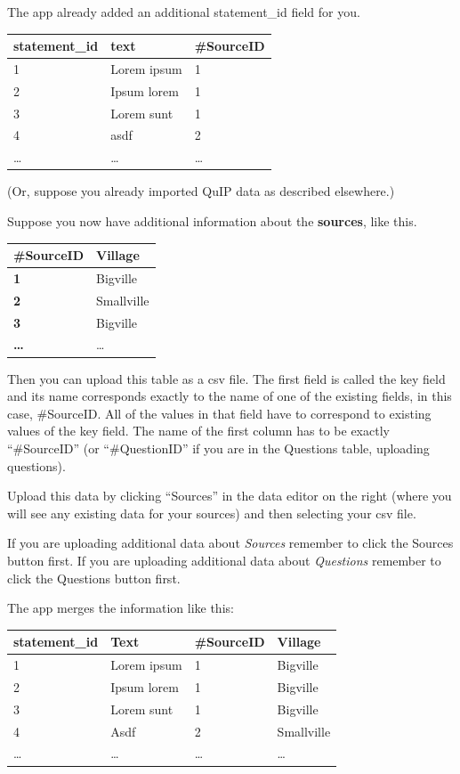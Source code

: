 \documentclass[
]{book}
\begin{document}
The app already added an additional statement\_id field for you.

\begin{longtable}[]{@{}lll@{}}
\toprule
\textbf{statement\_id} & \textbf{text} & \textbf{\#SourceID} \\
\midrule
\endhead
1 & Lorem ipsum & 1 \\
2 & Ipsum lorem & 1 \\
3 & Lorem sunt & 1 \\
4 & asdf & 2 \\
\ldots{} & \ldots{} & \ldots{} \\
\bottomrule
\end{longtable}

(Or, suppose you already imported QuIP data as described elsewhere.)

Suppose you now have additional information about the \textbf{sources}, like this.

\begin{longtable}[]{@{}ll@{}}
\toprule
\textbf{\#SourceID} & \textbf{Village} \\
\midrule
\endhead
\textbf{1} & Bigville \\
\textbf{2} & Smallville \\
\textbf{3} & Bigville \\
\textbf{\ldots{}} & \ldots{} \\
\bottomrule
\end{longtable}

Then you can upload this table as a csv file. The first field is called the key field and its name corresponds exactly to the name of one of the existing fields, in this case, \#SourceID. All of the values in that field have to correspond to existing values of the key field. The name of the first column has to be exactly ``\#SourceID'' (or ``\#QuestionID'' if you are in the Questions table, uploading questions).

Upload this data by clicking ``Sources'' in the data editor on the right (where you will see any existing data for your sources) and then selecting your csv file.

If you are uploading additional data about \emph{Sources} remember to click the Sources button first. If you are uploading additional data about \emph{Questions} remember to click the Questions button first.

The app merges the information like this:

\begin{longtable}[]{@{}llll@{}}
\toprule
\textbf{statement\_id} & \textbf{Text} & \textbf{\#SourceID} & \textbf{Village} \\
\midrule
\endhead
1 & Lorem ipsum & 1 & Bigville \\
2 & Ipsum lorem & 1 & Bigville \\
3 & Lorem sunt & 1 & Bigville \\
4 & Asdf & 2 & Smallville \\
\ldots{} & \ldots{} & \ldots{} & \ldots{} \\
\bottomrule
\end{longtable}
\end{document}

